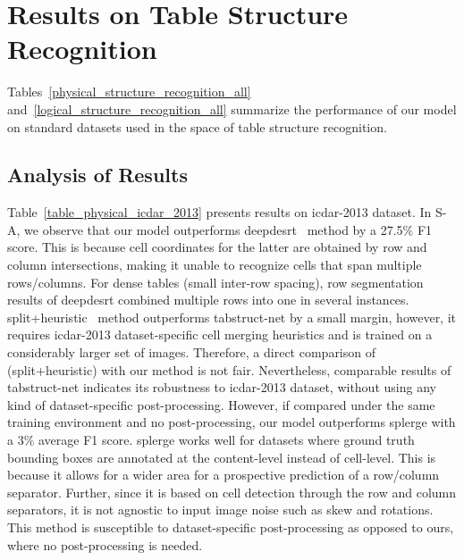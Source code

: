 \documentclass[runningheads]{llncs}
\begin{document}
\section{Results on Table Structure Recognition} \label{result_analysis_table_structure_recognition}

Tables~\ref{physical_structure_recognition_all} and~\ref{logical_structure_recognition_all} summarize the performance of our model on standard datasets used in the space of table structure recognition.

\subsection{Analysis of Results}

Table~\ref{table_physical_icdar_2013} presents results on {\sc icdar}-2013 dataset. In S-A, we observe that our model outperforms {\sc d}eep{\sc d}e{\sc srt}~\cite{schreiber2017deepdesrt} method by a 27.5\% F1 score. This is because cell coordinates for the latter are obtained by row and column intersections, making it unable to recognize cells that span multiple rows/columns. For dense tables (small inter-row spacing), row segmentation results of {\sc d}eep{\sc d}e{\sc srt} combined multiple rows into one in several instances. {\sc s}plit+{\sc h}euristic~\cite{table_splitting} method outperforms {\sc t}ab{\sc s}truct-{\sc n}et by a small margin, however, it requires {\sc icdar}-2013 dataset-specific cell merging heuristics and is trained on a considerably larger set of images. Therefore, a direct comparison of ({\sc s}plit+{\sc h}euristic) with our method is not fair. Nevertheless, comparable results of {\sc t}ab{\sc s}truct-{\sc n}et indicates its robustness to {\sc icdar}-2013 dataset, without using any kind of dataset-specific post-processing. However, if compared under the same training environment and no post-processing, our model outperforms {\sc splerge} with a 3\% average F1 score. {\sc splerge} works well for datasets where ground truth bounding boxes are annotated at the content-level instead of cell-level. This is because it allows for a wider area for a prospective prediction of a row/column separator. Further, since it is based on cell detection through the row and column separators, it is not agnostic to input image noise such as skew and rotations. This method is susceptible to dataset-specific post-processing as opposed to ours, where no post-processing is needed.
\end{document}
